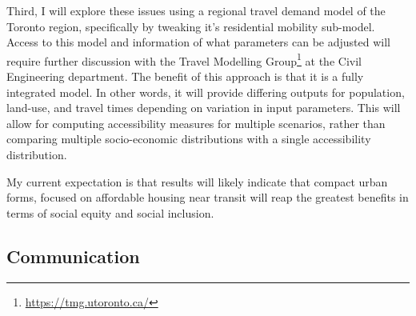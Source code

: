 Third, I will explore these issues using a regional travel demand model of the Toronto region, specifically by tweaking it's residential mobility sub-model. Access to this model and information of what parameters can be adjusted will require further discussion with the Travel Modelling Group\footnote{\url{https://tmg.utoronto.ca/}} at the Civil Engineering department. The benefit of this approach is that it is a fully integrated model. In other words, it will provide differing outputs for population, land-use, and travel times depending on variation in input parameters. This will allow for computing accessibility measures for multiple scenarios, rather than comparing multiple socio-economic distributions with a single accessibility distribution.

My current expectation is that results will likely indicate that compact urban forms, focused on affordable housing near transit will reap the greatest benefits in terms of social equity and social inclusion.




\subsection{Communication}




